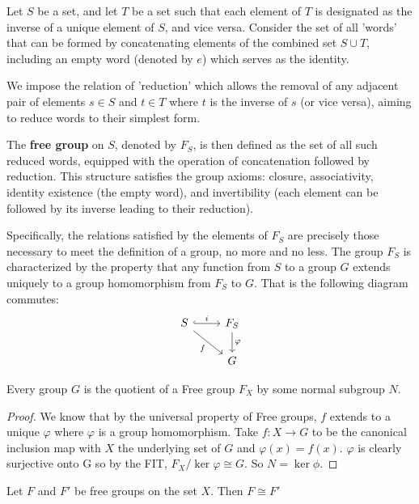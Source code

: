 \begin{definition}
Let $S$ be a set, and let $T$ be a set such that each element of $T$ is designated as the inverse of a unique element of $S$, and vice versa. Consider the set of all 'words' that can be formed by concatenating elements of the combined set $S \cup T$, including an empty word (denoted by $e$) which serves as the identity.

We impose the relation of 'reduction' which allows the removal of any adjacent pair of elements $s \in S$ and $t \in T$ where $t$ is the inverse of $s$ (or vice versa), aiming to reduce words to their simplest form. 

The \textbf{free group} on $S$, denoted by $F_S$, is then defined as the set of all such reduced words, equipped with the operation of concatenation followed by reduction. This structure satisfies the group axioms: closure, associativity, identity existence (the empty word), and invertibility (each element can be followed by its inverse leading to their reduction).

Specifically, the relations satisfied by the elements of $F_S$ are precisely those necessary to meet the definition of a group, no more and no less. The group $F_S$ is characterized by the property that any function from $S$ to a group $G$ extends uniquely to a group homomorphism from $F_S$ to $G$. That is the following diagram commutes:
\[
\begin{tikzcd}
S \arrow[r, hook, "i"] \arrow[rd, "f"'] & F_S \arrow[d, "\varphi"] \\
 & G
\end{tikzcd}
\]
\end{definition}

\begin{theorem}
    Every group $G$ is the quotient of a Free group $F_X$ by some normal subgroup $N$.
\end{theorem}

\begin{proof}
    We know that by the universal property of Free groups, $f$ extends to a unique $\varphi$ where $\varphi$ is a group homomorphism. Take $f: X \to G$ to be the canonical inclusion map with $X$ the underlying set of $G$ and $\varphi(x) = f(x).$ $\varphi$ is clearly surjective onto G so by the FIT, $F_X/\ker \varphi \cong G$. So $N = \ker \phi$.
\end{proof}

\begin{theorem}
    Let $F$ and $F'$ be free groups on the set $X$. Then $F \cong F'$
\end{theorem}

